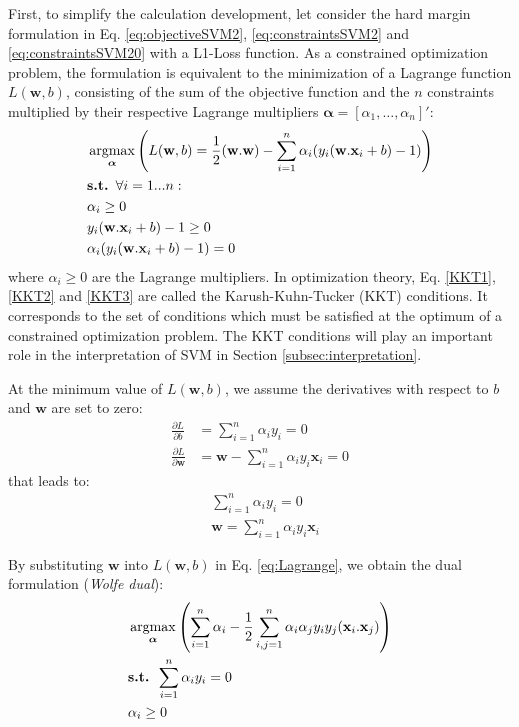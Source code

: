 First, to simplify the calculation development, let consider the hard margin formulation in Eq. \ref{eq:objectiveSVM2}, \ref{eq:constraintsSVM2} and \ref{eq:constraintsSVM20} with a L1-Loss function. As a constrained optimization problem, the formulation is equivalent to the minimization of a Lagrange function $L(\textbf{w},b)$, consisting of the sum of the objective function and the $n$ constraints multiplied by their respective Lagrange multipliers $\boldsymbol{\alpha} = [\alpha_1, \ldots, \alpha_n]'$: 
\begin{align}
	& \argmax_{\boldsymbol{\alpha}} \left( L(\textbf{w},b) = \frac{1}{2}(\textbf{w}.\textbf{w})-\sum\limits_{i=1}^{n}\alpha_i(y_i(\textbf{w}.\textbf{x}_i+b)-1) \right) \label{eq:Lagrange} \\
	& \textbf{s.t. } \forall i = 1...n: \nonumber \\
	& \alpha_i \geq 0 \label{KKT1}\\
	& y_i(\textbf{w}.\textbf{x}_i+b)-1 \geq 0 \label{KKT2}\\
	& \alpha_i (y_i(\textbf{w}.\textbf{x}_i+b)-1) = 0 \label{KKT3}
\end{align}
\noindent where $\alpha_i \geq 0$ are the Lagrange multipliers. In optimization theory, Eq. \ref{KKT1}, \ref{KKT2} and \ref{KKT3} are called the Karush-Kuhn-Tucker (KKT) conditions. It corresponds to the set of conditions which must be satisfied at the optimum of a constrained optimization problem. The KKT conditions will play an important role in the interpretation of SVM in Section \ref{subsec:interpretation}. 

\noindent At the minimum value of $L(\textbf{w},b)$, we assume the derivatives with respect to $b$ and $\textbf{w}$ are set to zero:
\begin{align*}
\frac{\partial L}{\partial b} &= \sum\limits_{i=1}^{n}\alpha_i y_i = 0 \\
\frac{\partial L}{\partial \textbf{w}} &= \textbf{w}-\sum\limits_{i=1}^{n}\alpha_i y_i \textbf{x}_i = 0
\end{align*}
\noindent that leads to:
\begin{align}
&\sum\limits_{i=1}^{n}\alpha_i y_i = 0 \\
& \textbf{w} = \sum\limits_{i=1}^{n}\alpha_i y_i \textbf{x}_i
\end{align}

\noindent By substituting $\textbf{w}$ into $L(\textbf{w},b)$ in Eq. \ref{eq:Lagrange}, we obtain the dual formulation (\textit{Wolfe dual}):
\begin{align}
	& \argmax_{\boldsymbol{\alpha}} \left( 
	\sum\limits_{i=1}^{n} \alpha_i - \frac{1}{2} \sum\limits_{i,j=1}^{n} \alpha_i \alpha_j y_i y_j (\textbf{x}_i . \textbf{x}_j) 
	\right) 
	\label{eq:dualSVM}\\
	& \textbf{s.t. } \sum\limits_{i=1}^{n}\alpha_i y_i = 0 \label{constraintdual1}\\
	& \alpha_i \geq 0 \label{constraintdual2}
\end{align}

